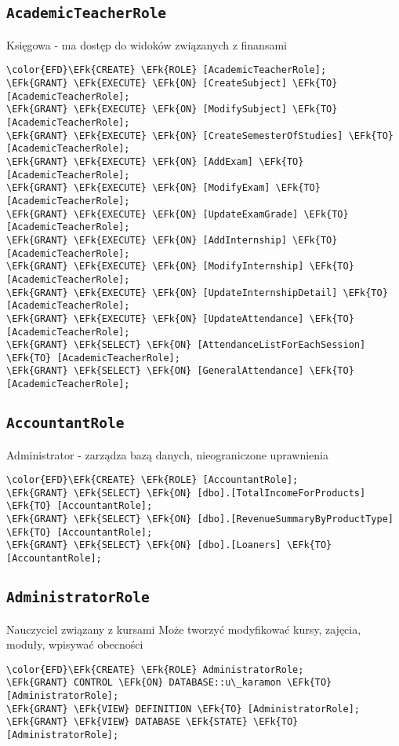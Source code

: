 \documentclass[11pt]{article}
\newcommand{\EFk}[1]{\textcolor{EFk}{\textbf{#1}}} %
\begin{document}
\subsection{\texttt{AcademicTeacherRole}}
\label{sec:org83ed54d}
Księgowa - ma dostęp do widoków związanych z finansami
\begin{Code}
\begin{Verbatim}
\color{EFD}\EFk{CREATE} \EFk{ROLE} [AcademicTeacherRole];
\EFk{GRANT} \EFk{EXECUTE} \EFk{ON} [CreateSubject] \EFk{TO} [AcademicTeacherRole];
\EFk{GRANT} \EFk{EXECUTE} \EFk{ON} [ModifySubject] \EFk{TO} [AcademicTeacherRole];
\EFk{GRANT} \EFk{EXECUTE} \EFk{ON} [CreateSemesterOfStudies] \EFk{TO} [AcademicTeacherRole];
\EFk{GRANT} \EFk{EXECUTE} \EFk{ON} [AddExam] \EFk{TO} [AcademicTeacherRole];
\EFk{GRANT} \EFk{EXECUTE} \EFk{ON} [ModifyExam] \EFk{TO} [AcademicTeacherRole];
\EFk{GRANT} \EFk{EXECUTE} \EFk{ON} [UpdateExamGrade] \EFk{TO} [AcademicTeacherRole];
\EFk{GRANT} \EFk{EXECUTE} \EFk{ON} [AddInternship] \EFk{TO} [AcademicTeacherRole];
\EFk{GRANT} \EFk{EXECUTE} \EFk{ON} [ModifyInternship] \EFk{TO} [AcademicTeacherRole];
\EFk{GRANT} \EFk{EXECUTE} \EFk{ON} [UpdateInternshipDetail] \EFk{TO} [AcademicTeacherRole];
\EFk{GRANT} \EFk{EXECUTE} \EFk{ON} [UpdateAttendance] \EFk{TO} [AcademicTeacherRole];
\EFk{GRANT} \EFk{SELECT} \EFk{ON} [AttendanceListForEachSession] \EFk{TO} [AcademicTeacherRole];
\EFk{GRANT} \EFk{SELECT} \EFk{ON} [GeneralAttendance] \EFk{TO} [AcademicTeacherRole];
\end{Verbatim}
\end{Code}
\subsection{\texttt{AccountantRole}}
\label{sec:orgd965d1f}
Administrator - zarządza bazą danych, nieograniczone uprawnienia
\begin{Code}
\begin{Verbatim}
\color{EFD}\EFk{CREATE} \EFk{ROLE} [AccountantRole];
\EFk{GRANT} \EFk{SELECT} \EFk{ON} [dbo].[TotalIncomeForProducts] \EFk{TO} [AccountantRole];
\EFk{GRANT} \EFk{SELECT} \EFk{ON} [dbo].[RevenueSummaryByProductType] \EFk{TO} [AccountantRole];
\EFk{GRANT} \EFk{SELECT} \EFk{ON} [dbo].[Loaners] \EFk{TO} [AccountantRole];
\end{Verbatim}
\end{Code}
\subsection{\texttt{AdministratorRole}}
\label{sec:org912a375}
Nauczyciel związany z kursami Może tworzyć modyfikować kursy, zajęcia, moduły, wpisywać obecności
\begin{Code}
\begin{Verbatim}
\color{EFD}\EFk{CREATE} \EFk{ROLE} AdministratorRole;
\EFk{GRANT} CONTROL \EFk{ON} DATABASE::u\_karamon \EFk{TO} [AdministratorRole];
\EFk{GRANT} \EFk{VIEW} DEFINITION \EFk{TO} [AdministratorRole];
\EFk{GRANT} \EFk{VIEW} DATABASE \EFk{STATE} \EFk{TO} [AdministratorRole];
\end{Verbatim}
\end{Code}
\end{document}

